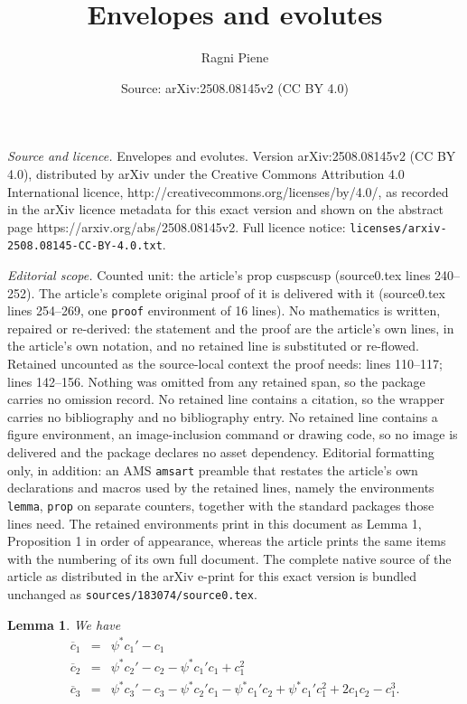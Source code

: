 \documentclass[10pt,a4paper]{amsart}
\title{Envelopes and evolutes}
\author{Ragni Piene}
\date{Source: arXiv:2508.08145v2 (CC BY 4.0)}
\newtheorem{lemma}{Lemma}
\begin{document}
\maketitle

\noindent\emph{Source and licence.} Envelopes and evolutes. Version arXiv:2508.08145v2 (CC BY 4.0), distributed by arXiv under the Creative Commons Attribution 4.0 International licence, http://creativecommons.org/licenses/by/4.0/, as recorded in the arXiv licence metadata for this exact version and shown on the abstract page https://arxiv.org/abs/2508.08145v2. Full licence notice: \texttt{licenses/arxiv-2508.08145-CC-BY-4.0.txt}.\par\smallskip

\noindent\textit{Editorial scope.} Counted unit: the article's prop cuspscusp (source0.tex lines 240--252). The article's complete original proof of it is delivered with it (source0.tex lines 254--269, one \texttt{proof} environment of 16 lines). No mathematics is written, repaired or re-derived: the statement and the proof are the article's own lines, in the article's own notation, and no retained line is substituted or re-flowed.  Retained uncounted as the source-local context the proof needs: lines 110--117; lines 142--156.  Nothing was omitted from any retained span, so the package carries no omission record.  No retained line contains a citation, so the wrapper carries no bibliography and no bibliography entry.  No retained line contains a figure environment, an image-inclusion command or drawing code, so no image is delivered and the package declares no asset dependency.  Editorial formatting only, in addition: an AMS \texttt{amsart} preamble that restates the article's own declarations and macros used by the retained lines, namely the environments \texttt{lemma}, \texttt{prop} on separate counters, together with the standard packages those lines need.  The retained environments print in this document as Lemma 1, Proposition 1 in order of appearance, whereas the article prints the same items with the numbering of its own full document.  The complete native source of the article as distributed in the arXiv e-print for this exact version is bundled unchanged as \texttt{sources/183074/source0.tex}.
\begin{lemma}\label{chern}
We have
\begin{eqnarray*}
\overline c_1   &=&  \psi^*c_1'-c_1\\
\overline c_2 &=&  \psi^*c_2'-c_2-\psi^*c_1'c_1+c_1^2\\
\overline c_3  &=&  \psi^*c_3'-c_3-\psi^*c_2'c_1-\psi^*c_1'c_2+\psi^*c_1'c_1^2+2c_1c_2-c_1^3.
\end{eqnarray*}
\end{lemma}
\end{document}
